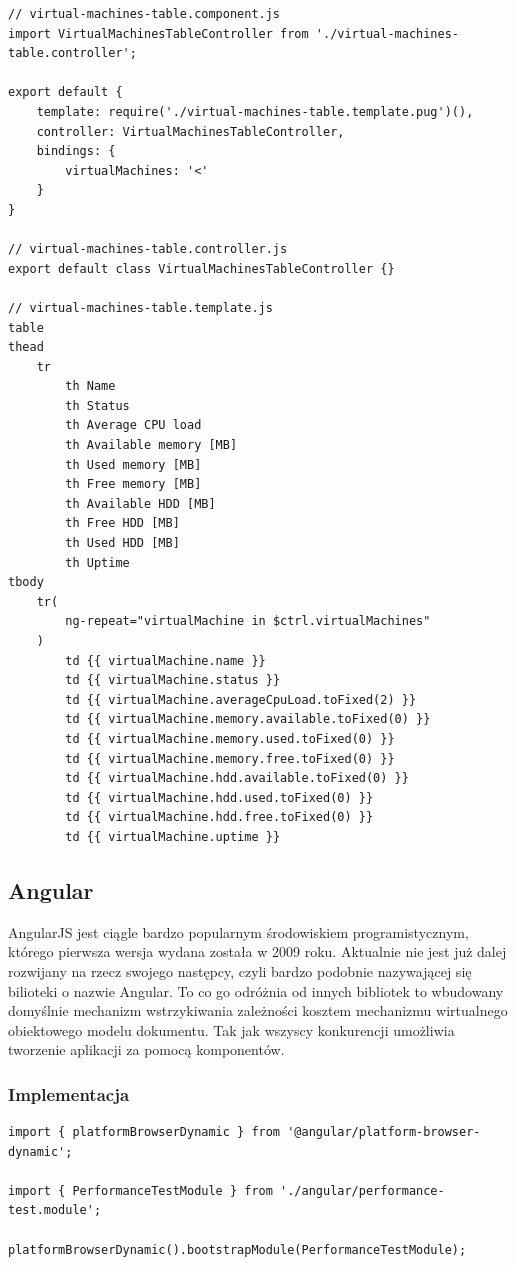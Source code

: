 \documentclass[polish, twoside, 12pt]{mwart}
\begin{document}
\begin{lstlisting}[caption=Komponent tabeli]
// virtual-machines-table.component.js
import VirtualMachinesTableController from './virtual-machines-table.controller';

export default {
    template: require('./virtual-machines-table.template.pug')(),
    controller: VirtualMachinesTableController,
    bindings: {
        virtualMachines: '<'
    }
}

// virtual-machines-table.controller.js
export default class VirtualMachinesTableController {}

// virtual-machines-table.template.js
table
thead
    tr
        th Name
        th Status
        th Average CPU load
        th Available memory [MB]
        th Used memory [MB]
        th Free memory [MB]
        th Available HDD [MB]
        th Free HDD [MB]
        th Used HDD [MB]
        th Uptime
tbody
    tr(
        ng-repeat="virtualMachine in $ctrl.virtualMachines"
    )
        td {{ virtualMachine.name }}
        td {{ virtualMachine.status }}
        td {{ virtualMachine.averageCpuLoad.toFixed(2) }}
        td {{ virtualMachine.memory.available.toFixed(0) }}
        td {{ virtualMachine.memory.used.toFixed(0) }}
        td {{ virtualMachine.memory.free.toFixed(0) }}
        td {{ virtualMachine.hdd.available.toFixed(0) }}
        td {{ virtualMachine.hdd.used.toFixed(0) }}
        td {{ virtualMachine.hdd.free.toFixed(0) }}
        td {{ virtualMachine.uptime }}
\end{lstlisting}

\subsection{Angular}

AngularJS jest ciągle bardzo popularnym środowiskiem programistycznym, którego pierwsza wersja wydana została w 2009 roku. Aktualnie nie jest już dalej rozwijany na rzecz swojego następcy, czyli bardzo podobnie nazywającej się bilioteki o nazwie Angular. To co go odróżnia od innych bibliotek to wbudowany domyślnie mechanizm wstrzykiwania zależności kosztem mechanizmu wirtualnego obiektowego modelu dokumentu. Tak jak wszyscy konkurencji umożliwia tworzenie aplikacji za pomocą komponentów.

\subsubsection{Implementacja}

\begin{lstlisting}[caption=Inicjalizacja głównego modułu]
import { platformBrowserDynamic } from '@angular/platform-browser-dynamic';

import { PerformanceTestModule } from './angular/performance-test.module';

platformBrowserDynamic().bootstrapModule(PerformanceTestModule);
\end{lstlisting}
\end{document}
